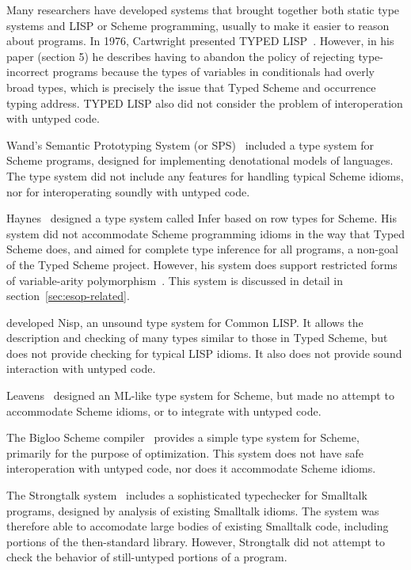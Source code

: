 \begin{schemeregion}
Many researchers have developed systems that brought together both
static type systems and LISP or Scheme programming, usually to 
make it easier to reason about programs.
 In 1976, Cartwright presented  TYPED
 LISP~\citeyearpar{c:typed-lisp}.  However, in his paper (section 5) he
 describes having to abandon the policy of rejecting type-incorrect
 programs because the types of variables in conditionals had overly
 broad types, which is precisely the issue that Typed Scheme and
 occurrence typing address.  TYPED LISP also did not consider the
 problem of interoperation with untyped code.

 Wand's Semantic Prototyping System (or SPS)~\cite{wand84} included a type
 system for Scheme programs, designed for implementing denotational
 models of languages.  The type system did not include any features
 for handling typical Scheme idioms, nor for interoperating soundly
 with untyped code.  

 Haynes~\cite{h:infer} designed a type system called Infer based on
 row types for Scheme.  His system did not accommodate Scheme
 programming  idioms in the way 
 that Typed Scheme does, and aimed for complete type inference
 for all programs, a non-goal of the Typed Scheme project.  However,
 his system does support restricted forms of variable-arity
 polymorphism~\cite{dh:var-ar}.  This system is discussed in detail in
 section~\ref{sec:esop-related}.    

 \citet{m:nisp} developed Nisp, an unsound type system for Common
 LISP. It allows the description and checking of many types similar to
 those in Typed Scheme, but does not provide checking for typical LISP
 idioms.  It also does not provide sound interaction with untyped
 code.  

 Leavens~\cite{leavens} designed an ML-like type system for Scheme,
 but made no attempt to accommodate Scheme idioms, or to integrate with
 untyped code.  

 The Bigloo Scheme compiler~\cite{bigloo} provides a simple type
 system for Scheme, primarily for the purpose of optimization.  This
 system does not have safe interoperation with untyped code, nor does
 it accommodate Scheme idioms.

The Strongtalk system~\cite{strongtalk} includes a sophisticated 
typechecker for
 Smalltalk programs, designed by analysis of existing Smalltalk
 idioms.  The system was therefore able to accomodate large bodies of
 existing Smalltalk code, including portions of the then-standard
 library.  However, Strongtalk did not attempt to check the behavior
 of still-untyped portions of a program.



\end{schemeregion}
